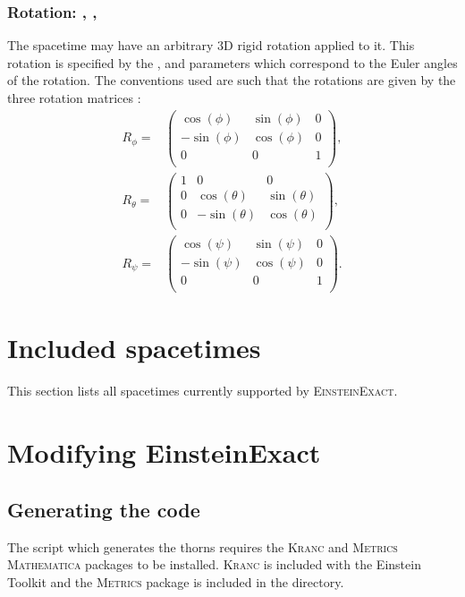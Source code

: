 \documentclass{article}
\begin{document}
\subsubsection{Rotation: , , }
The spacetime may have an arbitrary $3$D rigid rotation applied to it. This
rotation is specified by the ,  and  parameters
which correspond to the Euler angles of the rotation. The conventions used are
such that the rotations are given by the three rotation matrices \cite{EinsteinExact_Euler}:
\begin{align}
R_\phi =& 
\left(
\begin{array}{ccc}
 \cos (\phi ) & \sin (\phi ) & 0 \\
 -\sin (\phi ) & \cos (\phi ) & 0 \\
 0 & 0 & 1 \\
\end{array}
\right), \nonumber \\
R_\theta =&
\left(
\begin{array}{ccc}
 1 & 0 & 0 \\
 0 & \cos (\theta ) & \sin (\theta ) \\
 0 & -\sin (\theta ) & \cos (\theta ) \\
\end{array}
\right), \nonumber \\
R_\psi =&
\left(
\begin{array}{ccc}
 \cos (\psi ) & \sin (\psi ) & 0 \\
 -\sin (\psi ) & \cos (\psi ) & 0 \\
 0 & 0 & 1 \\
\end{array}
\right).
\end{align}

\section{Included spacetimes}

This section lists all spacetimes currently supported by \textsc{EinsteinExact}.



\section{Modifying EinsteinExact}

\subsection{Generating the code}
The script which generates the thorns requires the \textsc{Kranc} and
\textsc{Metrics} \textsc{Mathematica} packages to be installed. \textsc{Kranc}
is included with the Einstein Toolkit and the \textsc{Metrics} package is
included in the  directory.
\end{document}
